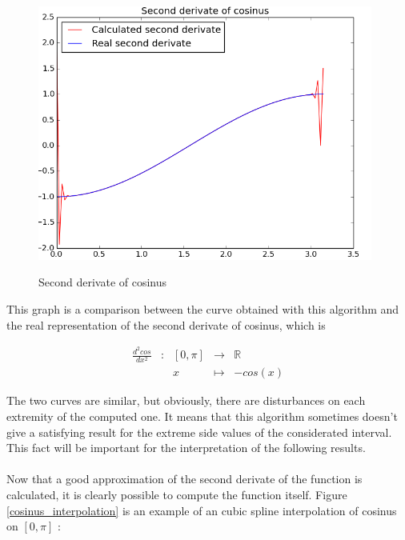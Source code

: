 \documentclass{article}
\begin{document}
\begin{figure}[h]
  \centering
  \caption{Second derivate of cosinus}
  \includegraphics[width=11cm]{cosinus_second_derivate}
  \label{cosinus_second_derivate}
\end{figure}

This graph is a comparison between the curve obtained with this algorithm and the real representation of the second derivate of cosinus, which is

\begin{equation}
\begin{array}{ccccl}
\frac{d^2 cos}{dx^2} & : & [0, \pi] & \to & \mathbb{R} \\
 & & x & \mapsto & -cos(x)
\end{array}
\end{equation}

The two curves are similar, but obviously, there are disturbances on each extremity of the computed one. It means that this algorithm sometimes doesn't give a satisfying result for the extreme side values of the considerated interval. This fact will be important for the interpretation of the following results.\\\\

Now that a good approximation of the second derivate of the function is calculated, it is clearly possible to compute the function itself. Figure \ref{cosinus_interpolation} is an example of an cubic spline interpolation of cosinus on $[0, \pi]$ :
\end{document}
